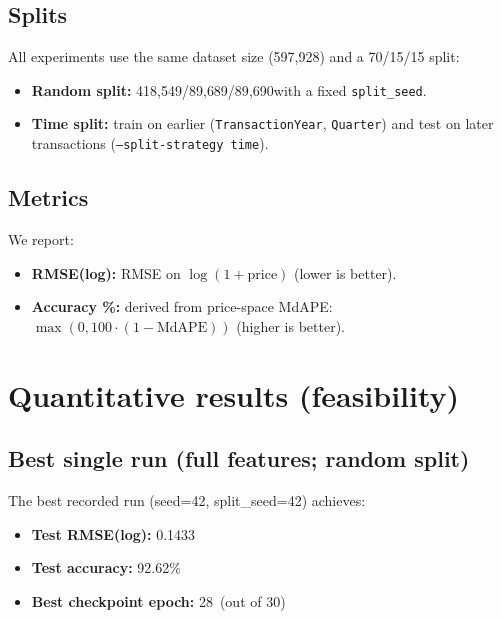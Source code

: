 \documentclass[11pt]{article}
\newcommand{\NTotal}{597{,}928}
\newcommand{\NTrain}{418{,}549}
\newcommand{\NVal}{89{,}689}
\newcommand{\NTest}{89{,}690}
\newcommand{\AnnEpochs}{30}
\newcommand{\AnnBestEpoch}{28}
\newcommand{\AnnBestTestRmse}{0.1433}
\newcommand{\AnnBestTestAcc}{92.62}
\begin{document}
\subsection{Splits}
All experiments use the same dataset size (\NTotal) and a 70/15/15 split:
\begin{itemize}[leftmargin=*]
  \item \textbf{Random split:} \NTrain/\NVal/\NTest with a fixed \texttt{split\_seed}.
  \item \textbf{Time split:} train on earlier (\texttt{TransactionYear}, \texttt{Quarter}) and test on later transactions (\texttt{--split-strategy time}).
\end{itemize}

\subsection{Metrics}
We report:
\begin{itemize}[leftmargin=*]
  \item \textbf{RMSE(log):} RMSE on \(\log(1+\text{price})\) (lower is better).
  \item \textbf{Accuracy \%:} derived from price-space MdAPE: \(\max(0, 100\cdot(1-\text{MdAPE}))\) (higher is better).
\end{itemize}

\section{Quantitative results (feasibility)}
\subsection{Best single run (full features; random split)}
The best recorded run (seed=42, split\_seed=42) achieves:
\begin{itemize}[leftmargin=*]
  \item \textbf{Test RMSE(log):} \AnnBestTestRmse
  \item \textbf{Test accuracy:} \AnnBestTestAcc\%
  \item \textbf{Best checkpoint epoch:} \AnnBestEpoch\ (out of \AnnEpochs)
\end{itemize}
\end{document}
